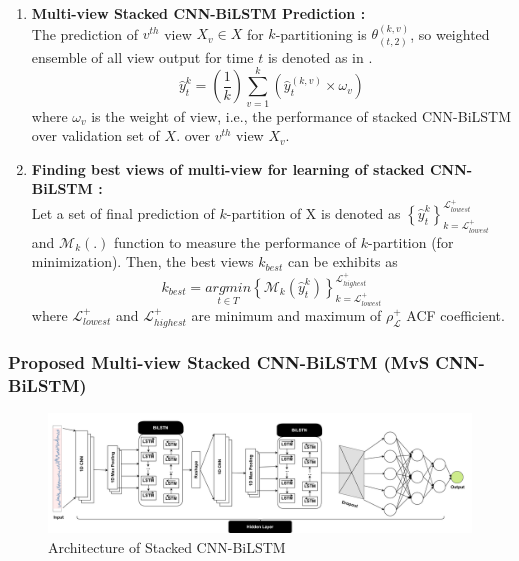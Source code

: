 \documentclass[a4paper, fleqn]{cas-sc}
\theoremstyle{definition}
\theoremstyle{remark}
\begin{document}
\begin{enumerate}[label=(\alph*)]
  \item \textbf{Multi-view Stacked CNN-BiLSTM Prediction : }\\
  The prediction of $v^{th}$ view $X_v \in X$ for $k$-partitioning is $\theta_{(t, 2)}^{(k, v)} $, so weighted ensemble of all view output for time $t$ is denoted as in  .
  \begin{equation} \label{sta cb}
    \hat{y}_t^k= \left(\frac{1}{k} \right) \sum_{v=1}^{k} \left(\hat{y}_t^{(k, v)} \times \omega_v \right)
  \end{equation}
  where $\omega_v$ is the weight of view, i.e.,  the performance of stacked CNN-BiLSTM over validation set of $X$. over $v^{th}$ view $X_v$.



  \item \textbf{Finding best views of multi-view for learning of stacked CNN-BiLSTM : }\\
Let a set of final prediction of $k$-partition of X is denoted as  $\left\{\hat{y}_t^k \right\}_{k=\mathscr{L}_{lowest}^+}^{\mathscr{L}_{lowest}^+}$ and $\mathcal{M}_k(.)$ function to measure the performance of $k$-partition (for minimization). Then,  the best views $k_{best}$ can be exhibits as 
  \begin{equation} \label{bv}
    k_{best}=\underset{t \in T}{arg min} \left\{\mathcal{M}_k \left(\hat{y}_t^k \right) \right\}_{k=\mathscr{L}_{lowest}^+}^{\mathscr{L}_{highest}^+}
  \end{equation}
  where $\mathscr{L}_{lowest}^+$ and $\mathscr{L}_{highest}^+$ are minimum and maximum of $\rho_{\mathscr{L}}^+$ ACF coefficient.

\end{enumerate}


\subsubsection{Proposed Multi-view Stacked CNN-BiLSTM (MvS CNN-BiLSTM)}
\begin{figure}[h!]
	\centering
		\includegraphics[scale=0.45]{Prpose}
	  \caption{Architecture of Stacked CNN-BiLSTM}\label{prosed_cnn-bilstm}
\end{figure}
\end{document}
